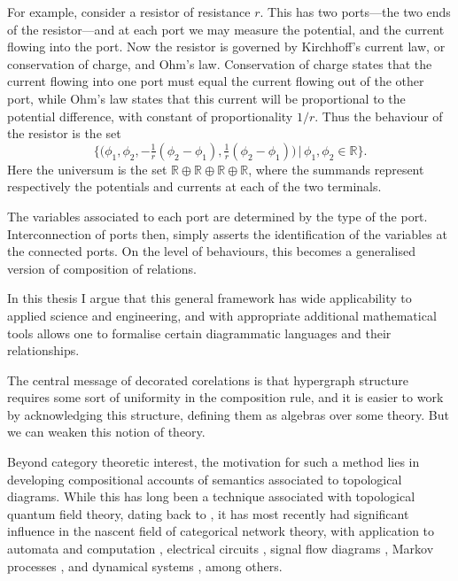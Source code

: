 For example, consider a resistor of resistance $r$. This has two ports---the two
ends of the resistor---and at each port we may measure the potential, and the
current flowing into the port. Now the resistor is governed by Kirchhoff's
current law, or conservation of charge, and Ohm's law. Conservation of charge
states that the current flowing into one port must equal the current flowing out
of the other port, while Ohm's law states that this current will be proportional
to the potential difference, with constant of proportionality $1/r$. Thus the
behaviour of the resistor is the set 
\[
  \big\{\big(\phi_1,\phi_2,
    -\tfrac1r(\phi_2-\phi_1),\tfrac1r(\phi_2-\phi_1)\big)\,\big\vert\,
    \phi_1,\phi_2 \in \mathbb{R}\big\}.
\]
Here the universum is the set
$\mathbb{R}\oplus\mathbb{R}\oplus\mathbb{R}\oplus\mathbb{R}$, where the
summands represent respectively the potentials and currents at each of the two
terminals.


The variables associated to each port are determined by the type of the port.
Interconnection of ports then, simply asserts the identification of the
variables at the connected ports. On the level of behaviours, this becomes a
generalised version of composition of relations.

In this thesis I argue that this general framework has wide applicability to
applied science and engineering, and with appropriate additional mathematical
tools allows one to formalise certain diagrammatic languages and their
relationships.

The central message of decorated corelations is that hypergraph structure
requires some sort of uniformity in the composition rule, and it is easier to
work by acknowledging this structure, defining them as algebras over some
theory. But we can weaken this notion of theory.

Beyond category theoretic interest, the motivation for such a method lies in
developing compositional accounts of semantics associated to topological
diagrams. While this has long been a technique associated with topological
quantum field theory, dating back to \cite{At}, it has most recently had
significant influence in the nascent field of categorical network theory, with
application to automata and computation \cite{KSW2, Sp}, electrical circuits
\cite{BF}, signal flow diagrams \cite{BSZ, BE}, Markov processes \cite{BP,
ASW}, and dynamical systems \cite{VSL}, among others. 

